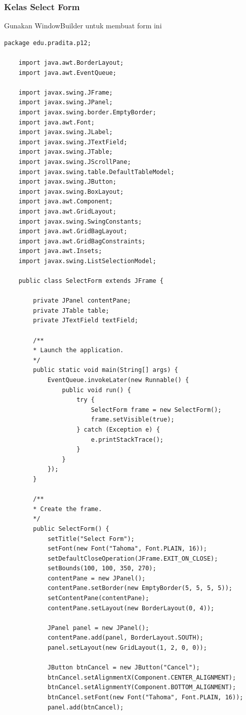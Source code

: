 \subsubsection{Kelas Select Form}

Gunakan WindowBuilder untuk membuat form ini

\begin{lstlisting}[style=JavaStyle]
	package edu.pradita.p12;
	
	import java.awt.BorderLayout;
	import java.awt.EventQueue;
	
	import javax.swing.JFrame;
	import javax.swing.JPanel;
	import javax.swing.border.EmptyBorder;
	import java.awt.Font;
	import javax.swing.JLabel;
	import javax.swing.JTextField;
	import javax.swing.JTable;
	import javax.swing.JScrollPane;
	import javax.swing.table.DefaultTableModel;
	import javax.swing.JButton;
	import javax.swing.BoxLayout;
	import java.awt.Component;
	import java.awt.GridLayout;
	import javax.swing.SwingConstants;
	import java.awt.GridBagLayout;
	import java.awt.GridBagConstraints;
	import java.awt.Insets;
	import javax.swing.ListSelectionModel;
	
	public class SelectForm extends JFrame {
		
		private JPanel contentPane;
		private JTable table;
		private JTextField textField;
		
		/**
		* Launch the application.
		*/
		public static void main(String[] args) {
			EventQueue.invokeLater(new Runnable() {
				public void run() {
					try {
						SelectForm frame = new SelectForm();
						frame.setVisible(true);
					} catch (Exception e) {
						e.printStackTrace();
					}
				}
			});
		}
		
		/**
		* Create the frame.
		*/
		public SelectForm() {
			setTitle("Select Form");
			setFont(new Font("Tahoma", Font.PLAIN, 16));
			setDefaultCloseOperation(JFrame.EXIT_ON_CLOSE);
			setBounds(100, 100, 350, 270);
			contentPane = new JPanel();
			contentPane.setBorder(new EmptyBorder(5, 5, 5, 5));
			setContentPane(contentPane);
			contentPane.setLayout(new BorderLayout(0, 4));
			
			JPanel panel = new JPanel();
			contentPane.add(panel, BorderLayout.SOUTH);
			panel.setLayout(new GridLayout(1, 2, 0, 0));
			
			JButton btnCancel = new JButton("Cancel");
			btnCancel.setAlignmentX(Component.CENTER_ALIGNMENT);
			btnCancel.setAlignmentY(Component.BOTTOM_ALIGNMENT);
			btnCancel.setFont(new Font("Tahoma", Font.PLAIN, 16));
			panel.add(btnCancel);
			

\end{lstlisting}
